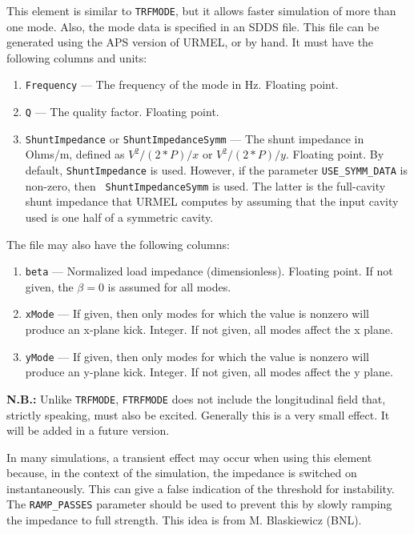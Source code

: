 This element is similar to {\tt TRFMODE}, but it allows faster simulation of more than
one mode.  Also, the mode data is specified in an SDDS file.  This file can be
generated using the APS version of URMEL, or by hand. It must have the following
columns and units:
\begin{enumerate}
\item {\tt Frequency} --- The frequency of the mode in Hz.  Floating point.
\item {\tt Q} --- The quality factor.  Floating point.
\item {\tt ShuntImpedance} or {\tt ShuntImpedanceSymm} --- The shunt
  impedance in Ohms/m, defined as $V^2/(2*P)/x$ or $V^2/(2*P)/y$.
  Floating point. By default, {\tt ShuntImpedance} is used.  However,
  if the parameter \verb|USE_SYMM_DATA| is non-zero, then {\tt
  ShuntImpedanceSymm} is used.  The latter is the full-cavity shunt
  impedance that URMEL computes by assuming that the input cavity used
  is one half of a symmetric cavity.
\end{enumerate}

The file may also have the following columns:
\begin{enumerate}
\item {\tt beta} --- Normalized load impedance (dimensionless).  Floating point. If not given, the
 $\beta=0$ is assumed for all modes. 
\item {\tt xMode} --- If given, then only modes for which the value is nonzero will produce an
 x-plane kick.  Integer.  If not given, all modes affect the x plane.
\item {\tt yMode} --- If given, then only modes for which the value is nonzero will produce an
 y-plane kick.  Integer.  If not given, all modes affect the y plane.
\end{enumerate}
    
{\bf N.B.:} Unlike {\tt TRFMODE}, {\tt FTRFMODE} does not include the longitudinal field that,
strictly speaking, must also be excited.  Generally this is a very small effect.  It will be
added in a future version.

In many simulations, a transient effect may occur when using this
element because, in the context of the simulation, the impedance is
switched on instantaneously.  This can give a false indication of the
threshold for instability. The {\tt RAMP\_PASSES} parameter should
be used to prevent this by slowly ramping the impedance to full
strength.  This idea is from M. Blaskiewicz (BNL).
